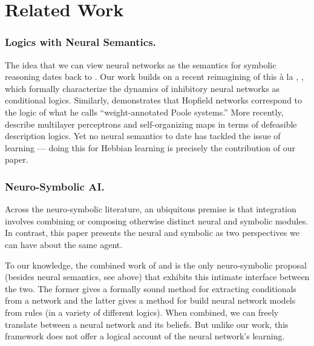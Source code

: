 \documentclass[letterpaper]{article}
\theoremstyle{definition}
\begin{document}
\section{Related Work}

\subsubsection{Logics with Neural Semantics.}
The idea that we can view neural networks as the semantics for symbolic reasoning dates back to \citep{mcculloch1943logical}.  Our work builds on a recent reimagining of this \`a la \citep{balkenius1991nonmonotonic}, \citep{leitgeb2001nonmonotonic,leitgeb2003nonmonotonic,leitgeb2018neural}, which formally characterize the dynamics of inhibitory neural networks as conditional logics.  Similarly, \citep{blutner2004nonmonotonic} demonstrates that Hopfield networks correspond to the logic of what he calls ``weight-annotated Poole systems.''  More recently, \citep{giordano2021} describe multilayer perceptrons and self-organizing maps in terms of defeasible description logics.  Yet no neural semantics to date has tackled the issue of learning --- doing this for Hebbian learning is precisely the contribution of our paper.

\subsubsection{Neuro-Symbolic AI.}
Across the neuro-symbolic literature, an ubiquitous premise is that integration involves combining or composing otherwise distinct neural and symbolic modules.  In contrast, this paper presents the neural and symbolic as two perspectives we can have about the same agent.

To our knowledge, the combined work of \citep{garcez2001symbolic} and \citep{garcez2008neural} is the only neuro-symbolic proposal (besides neural semantics, see above) that exhibits this intimate interface between the two.  The former gives a formally sound method for extracting conditionals from a network and the latter gives a method for build neural network models from rules (in a variety of different logics).  When combined, we can freely translate between a neural network and its beliefs.  But unlike our work, this framework does not offer a logical account of the neural network's learning.

\end{document}
